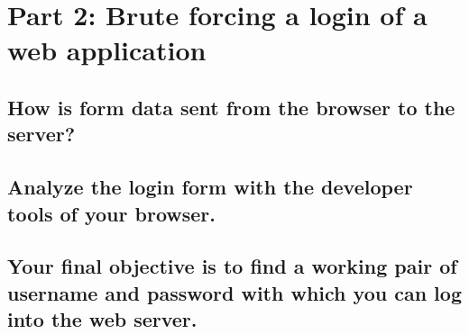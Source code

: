 \section{Part 2: Brute forcing a login of a web application}

\subsection{How is form data sent from the browser to the server?}

\subsection{Analyze the login form with the developer tools of your browser.}

\subsection{Your final objective is to find a working pair of username and password with which you can log into the web server.}
